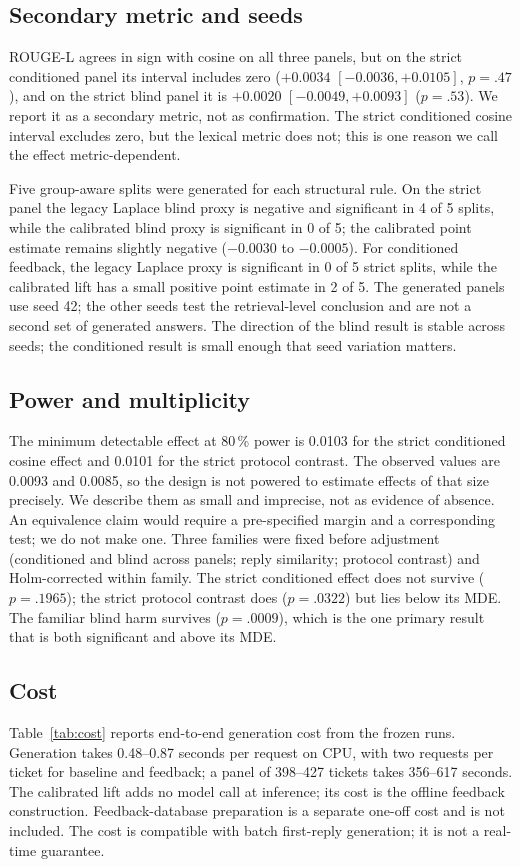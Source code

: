 \documentclass{ieeeaccess}
\begin{document}
\subsection{Secondary metric and seeds}
ROUGE-L agrees in sign with cosine on all three panels, but on the strict
conditioned panel its interval includes zero ($+0.0034$ $[-0.0036,+0.0105]$,
$p=.47$), and on the strict blind panel it is $+0.0020$ $[-0.0049,+0.0093]$
($p=.53$). We report it as a secondary metric, not as
confirmation. The strict conditioned cosine interval excludes zero, but the lexical
metric does not; this is one reason we call the effect metric-dependent.

Five group-aware splits were generated for each structural rule. On the strict
panel the legacy Laplace blind proxy is negative and significant in 4 of 5 splits,
while the calibrated blind proxy is significant in 0 of 5; the calibrated point
estimate remains slightly negative ($-0.0030$ to $-0.0005$). For conditioned
feedback, the legacy Laplace proxy is significant in 0 of 5 strict splits, while
the calibrated lift has a small positive point estimate in 2 of 5. The generated
panels use seed 42; the other seeds test the retrieval-level conclusion and are not
a second set of generated answers. The direction of the blind result is stable
across seeds; the conditioned result is small enough that seed variation matters.

\subsection{Power and multiplicity}
The minimum detectable effect at 80\,\% power is 0.0103 for the strict conditioned
cosine effect and 0.0101 for the strict protocol contrast. The observed values are
0.0093 and 0.0085, so the design is not powered to estimate effects of that size
precisely. We describe them as small and imprecise, not as evidence of absence. An
equivalence claim would require a pre-specified margin and a corresponding test; we
do not make one. Three families were fixed before adjustment (conditioned and blind
across panels; reply similarity; protocol contrast) and Holm-corrected within
family. The strict conditioned effect does not survive ($p=.1965$); the strict
protocol contrast does ($p=.0322$) but lies below its MDE. The familiar blind harm
survives ($p=.0009$), which is the one primary result that is both significant and
above its MDE.

\subsection{Cost}
Table~\ref{tab:cost} reports end-to-end generation cost from the frozen runs.
Generation takes 0.48--0.87 seconds per request on CPU, with two requests per ticket
for baseline and feedback; a panel of 398--427 tickets takes 356--617 seconds. The
calibrated lift adds no model call at inference; its cost is the offline feedback
construction. Feedback-database preparation is a separate one-off cost and is not
included. The cost is compatible with batch first-reply generation; it is not a
real-time guarantee.
\end{document}
